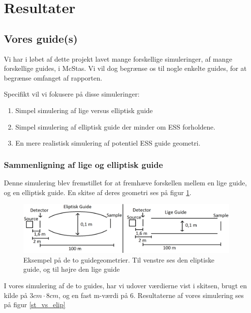 \documentclass[12pt,oneside,a4paper]{article}
\begin{document}
{{{{{\section{Resultater}

\subsection{Vores guide(s)}
Vi har i løbet af dette projekt lavet mange forskellige simuleringer, af mange forskellige guides, i McStas. Vi vil dog begrænse os til nogle enkelte guides, for at begrænse omfanget af rapporten.

Specifikt vil vi fokusere på disse simuleringer:
\begin{enumerate}
    \item Simpel simulering af lige versus elliptisk guide \cite{github:st_vs_el}
    \item Simpel simulering af elliptisk guide der minder om ESS forholdene. \cite{github:ess_sim_simple}
    \item En mere realistisk simulering af potentiel ESS guide geometri. \cite{github:ess_brill_optimized}
\end{enumerate}

\subsubsection{Sammenligning af lige og elliptisk guide}
Denne simulering blev fremstillet for at fremhæve forskellen mellem en lige guide, og en elliptisk guide. En skitse af deres geometri ses på figur \ref{lige_mod_eliptisk}.

\begin{figure}[H] 
\centering
\includegraphics[width=1\textwidth]{Straight_VS_Elipse.png}
\caption{Eksempel på de to guidegeometrier. Til venstre ses den eliptiske guide, og til højre den lige guide} \label{lige_mod_eliptisk}
\end{figure}

I vores simulering af de to guides, har vi udover værdierne vist i skitsen, brugt en kilde på $3cm\cdot8cm$, og en fast m-værdi på 6. Resultaterne af vores simulering ses på figur \ref{st_vs_elip}

}}}}}
\end{document}
